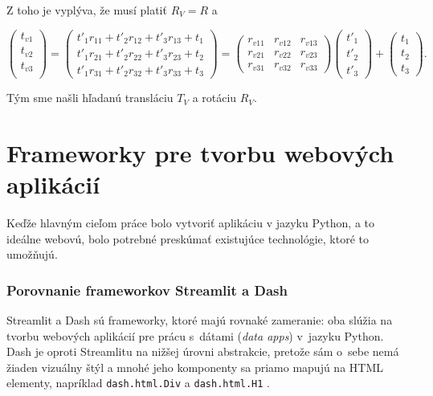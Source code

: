 Z toho je vyplýva, že musí platiť $R_V = R$ a

$$
    \begin{pmatrix}
    t_{v1} \\
    t_{v2} \\
    t_{v3} \\
    \end{pmatrix}
    =
    \begin{pmatrix}
    t'_1 r_{11} + t'_2 r_{12} + t'_3 r_{13} + t_1 \\
    t'_1 r_{21} + t'_2 r_{22} + t'_3 r_{23} + t_2 \\
    t'_1 r_{31} + t'_2 r_{32} + t'_3 r_{33} + t_3
    \end{pmatrix}
    =
    \begin{pmatrix}
    r_{v11} & r_{v12} & r_{v13} \\
    r_{v21} & r_{v22} & r_{v23} \\
    r_{v31} & r_{v32} & r_{v33}
    \end{pmatrix}
    \begin{pmatrix}
    t'_1 \\
    t'_2 \\
    t'_3
    \end{pmatrix}
    +
    \begin{pmatrix}
    t_1 \\
    t_2 \\
    t_3
    \end{pmatrix} \mathrm{.}
$$

Tým sme našli hľadanú transláciu $T_V$ a rotáciu $R_V$.

\section{Frameworky pre tvorbu webových aplikácií}

Keďže hlavným cieľom práce bolo vytvoriť aplikáciu v jazyku Python, a to ideálne webovú, bolo potrebné preskúmať existujúce technológie, ktoré to umožňujú.

\subsubsection{Porovnanie frameworkov Streamlit a Dash}

Streamlit a Dash sú frameworky, ktoré majú rovnaké zameranie: oba slúžia na tvorbu webových aplikácií pre prácu s~dátami (\emph{data apps}) v~jazyku Python. Dash je oproti Streamlitu na nižšej úrovni abstrakcie, pretože sám o~sebe nemá žiaden vizuálny štýl a mnohé jeho komponenty sa priamo mapujú na HTML elementy, napríklad \texttt{dash.html.Div} a \texttt{dash.html.H1} \cite{dash_documentation, streamlit_documentation}.

